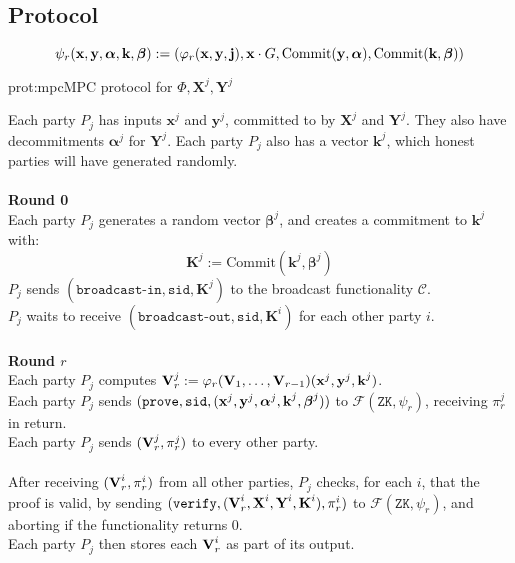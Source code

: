 \subsection{Protocol}

$$
\psi_r(\textbf{x}, \textbf{y}, \boldsymbol{\alpha}, \textbf{k}, \boldsymbol{\beta})
:= (\varphi_r(\textbf{x}, \textbf{y}, \textbf{j}), \textbf{x} \cdot G, \text{Commit}(\textbf{y}, \boldsymbol{\alpha}), \text{Commit}(\textbf{k}, \boldsymbol{\beta}))
$$

\begin{aprotocol}{prot:mpc}{MPC protocol for $\Phi, \textbf{X}^j, \textbf{Y}^j$}

Each party $P_j$ has inputs $\textbf{x}^j$ and $\textbf{y}^j$, committed to
by $\textbf{X}^j$ and $\textbf{Y}^j$.
They also have decommitments $\boldsymbol{\alpha}^j$ for $\textbf{Y}^j$.
Each party $P_j$ also has a vector $\textbf{k}^j$, which honest parties will
have generated randomly.\\
\\
\textbf{Round 0}\\
Each party $P_j$ generates a random vector $\boldsymbol{\beta}^j$, and creates
a commitment to $\textbf{k}^j$ with:
$$
\textbf{K}^j := \text{Commit}(\textbf{k}^j, \boldsymbol{\beta}^j)
$$
$P_j$ sends $(\texttt{broadcast-in}, \texttt{sid}, \textbf{K}^j)$ to
the broadcast functionality $\mathcal{C}$.\\
$P_j$ waits to receive $(\texttt{broadcast-out}, \texttt{sid}, \textbf{K}^i)$
for each other party $i$.\\
\\
\textbf{Round $r$}\\
Each party $P_j$ computes $\textbf{V}^j_r := \varphi_r(\textbf{V}_1, \ldots, \textbf{V}_{r - 1})(\textbf{x}^j, \textbf{y}^j, \textbf{k}^j)$.\\
Each party $P_j$ sends $(\texttt{prove}, \texttt{sid}, (\textbf{x}^j, \textbf{y}^j, \boldsymbol{\alpha}^j, \textbf{k}^j, \boldsymbol{\beta}^j))$
to $\mathcal{F}(\texttt{ZK}, \psi_r)$, receiving $\pi^j_r$ in return.\\
Each party $P_j$ sends $(\textbf{V}^j_r, \pi^j_r)$ to every other party.\\
\\
After receiving $(\textbf{V}^i_r, \pi^i_r)$  from all other parties, $P_j$ checks,
for each $i$, that the proof is valid, by sending $(\texttt{verify}, (\textbf{V}^i_r, \textbf{X}^i, \textbf{Y}^i, \textbf{K}^i), \pi^i_r)$ to
$\mathcal{F}(\texttt{ZK}, \psi_r)$, and aborting if the functionality returns $0$.\\
Each party $P_j$ then stores each $\textbf{V}^i_r$ as part of its output.
\end{aprotocol}

